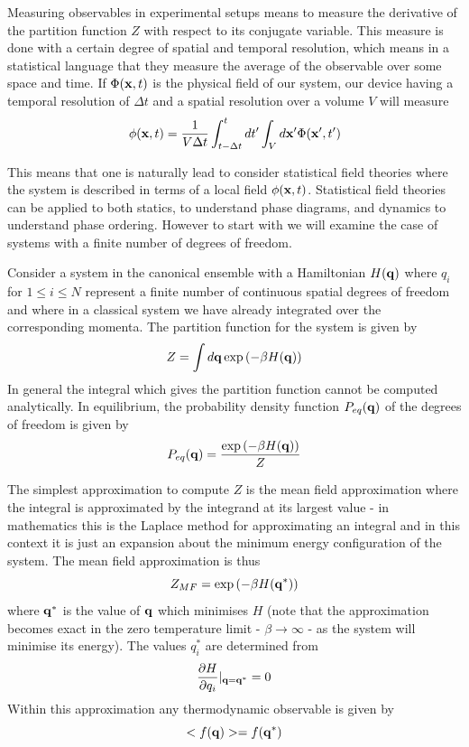 Measuring observables in experimental setups means to measure the derivative of the partition function $Z$ with respect to its conjugate variable. This measure is done with a certain degree of spatial and temporal resolution, which means in a statistical language that they measure the average of the observable over some space and time. If $\Phi({\bf x},t)$ is the physical field of our system, our device having a temporal resolution of $\Delta t$ and a spatial resolution over a volume $V$ will measure
\begin{align}
\phi({\bf x},t) = \frac{1}{V \Delta t} \int_{t-\Delta t}^{t} dt' \int_V d{\bf x}' \Phi({\bf x}',t')
\label{renormalisation}
\end{align}


This means that one is naturally lead to consider statistical field theories where the system is described in terms of a local field $\phi({\bf x},t)$. Statistical field theories can be applied to both statics, to understand phase diagrams, and dynamics to understand phase ordering. However to start with we will examine the case of systems with a finite number of degrees of freedom. 

Consider a system in the canonical ensemble with a Hamiltonian $H({\bf q})$ where $q_i$ for 
$1\leq i\leq N$ represent a finite number of continuous spatial degrees of freedom and where in a classical system we have already integrated over the corresponding momenta. The partition function for the system is given by
\begin{equation}
Z = \int d{\bf q} \exp\left(-\beta H({\bf q})\right)
\end{equation}
In general the integral which gives the partition function cannot be computed analytically. In equilibrium, the probability density function $P_{eq}({\bf q})$ of the degrees of freedom is given by 
\begin{equation}
P_{eq}({\bf q}) = \frac{\exp\left(-\beta H({\bf q})\right)}{Z}
\label{eqdis}
\end{equation}

The simplest approximation to compute $Z$ is the mean field approximation where the integral 
is approximated by the integrand at its largest value - in mathematics this is the Laplace method for approximating an integral and in this context it is just an expansion about the minimum energy configuration of the system. The mean field approximation is thus
\begin{equation}
Z_{MF}= \exp\left(-\beta H({\bf q}^*)\right)
\end{equation}
where ${\bf q}^*$ is the value of ${\bf q}$ which minimises $H$ (note that the approximation becomes exact in the zero temperature limit - $\beta \to \infty$ - as the system will minimise its energy). The values $q_i^*$ are determined from
\begin{equation}
\frac{\partial H}{\partial q_i}|_{{\bf q}={\bf q^*}}=0
\end{equation}
Within this approximation any thermodynamic observable is given by
\begin{equation}
< f({\bf q}) > = f({\bf q}^*)
\end{equation}


